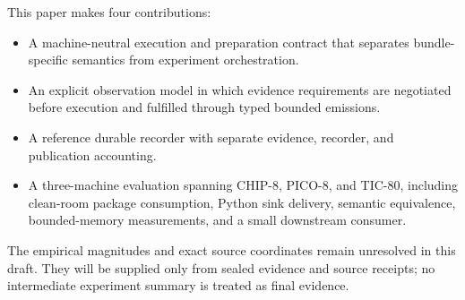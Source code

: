 This paper makes four contributions:

\begin{itemize}[leftmargin=*]
  \item A machine-neutral execution and preparation contract that separates
        bundle-specific semantics from experiment orchestration.
  \item An explicit observation model in which evidence requirements are
        negotiated before execution and fulfilled through typed bounded
        emissions.
  \item A reference durable recorder with separate evidence, recorder, and
        publication accounting.
  \item A three-machine evaluation spanning CHIP-8, PICO-8, and TIC-80,
        including clean-room package consumption, Python sink delivery,
        semantic equivalence, bounded-memory measurements, and a small
        downstream consumer.
\end{itemize}

The empirical magnitudes and exact source coordinates remain unresolved in
this draft. They will be supplied only from sealed evidence and source
receipts; no intermediate experiment summary is treated as final evidence.
